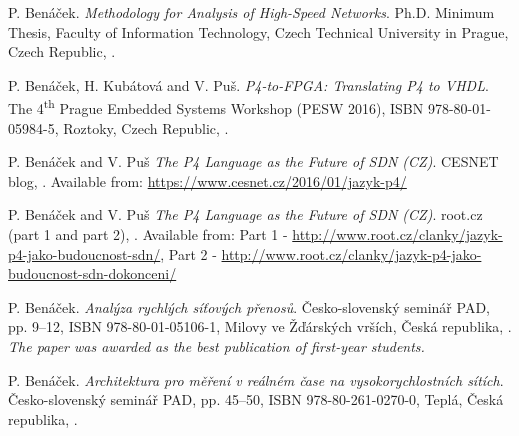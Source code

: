\renewcommand\bibname{Remaining Publications of the Author Relevant to the Thesis}
\begin{thebibliography}{A.9}%

P. Ben\'{a}\v{c}ek.
\newblock \textit{Methodology for Analysis of High-Speed Networks}. 
\newblock Ph.D. Minimum Thesis,  Faculty of Information Technology, Czech Technical University in Prague, Czech Republic, 
.

P. Ben\'{a}\v{c}ek, H. Kub\'{a}tov\'{a} and V. Pu\v{s}.
\newblock \textit{P4-to-FPGA: Translating P4 to VHDL}.
\newblock The 4\textsuperscript{th} Prague Embedded Systems Workshop (PESW 2016), ISBN 978-80-01-05984-5, Roztoky, Czech Republic,
.

P. Ben{\'a}{\v{c}}ek and V. Pu{\v{s}} 
\newblock \textit{The P4 Language as the Future of SDN (CZ)}. 
\newblock CESNET blog, 
. Available from: \url{https://www.cesnet.cz/2016/01/jazyk-p4/}

P. Ben{\'a}{\v{c}}ek and V. Pu{\v{s}} 
\newblock \textit{The P4 Language as the Future of SDN (CZ)}. 
\newblock root.cz (part 1 and part 2), 
. Available from: 
\newblock Part 1 - \url{http://www.root.cz/clanky/jazyk-p4-jako-budoucnost-sdn/}, 
\newblock Part 2 - \url{http://www.root.cz/clanky/jazyk-p4-jako-budoucnost-sdn-dokonceni/}


P. Ben\'{a}\v{c}ek.
\newblock \textit{Anal\'{y}za rychl\'{y}ch s\'{i}\v{t}ov\'{y}ch p\v{r}enos\r{u}}.
\newblock \v{C}esko-slovensk\'{y} semin\'{a}\v{r} PAD, pp. 9--12, ISBN 978-80-01-05106-1, Milovy ve \v{Z}\v{d}\'{a}rsk\'{y}ch vr\v{s}\'{i}ch, \v{C}esk\'{a} republika,
.
\newblock \textit{The paper was awarded as the best publication of first-year students.}

P. Ben\'{a}\v{c}ek.
\newblock \textit{Architektura pro m\v{e}\v{r}en\'{i} v re\'{a}ln\'{e}m \v{c}ase na vysokorychlostn\'{i}ch s\'{i}t\'{i}ch}.
\newblock \v{C}esko-slovensk\'{y} semin\'{a}\v{r} PAD, pp. 45--50, ISBN 978-80-261-0270-0, Tepl\'{a}, \v{C}esk\'{a} republika,
.


\end{thebibliography}
